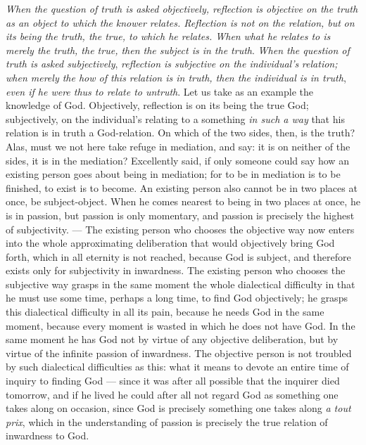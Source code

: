 \documentclass[12pt,a4paper,openany]{book}
\newcommand{\opage}[1]{\marginnote{\footnotesize\textit{[#1]}}}
\begin{document}
\emph{When the question of truth is asked objectively,
reflection is objective on the truth
as an object to which the}
\setcounter{footnote}{0}%
\opage{184}\emph{knower relates. Reflection is not on the relation, but}
\emph{on its being the truth, the true, to which he relates. When}
\emph{what he relates to is merely the truth, the true, then the subject is in the truth}.
\emph{When the question of truth is asked subjectively},
\emph{reflection is subjective on the individual's}
\emph{relation; when merely the how of this relation
is in truth, then the individual is in truth},
\emph{even if he were thus to relate to untruth}.
Let us take as an example the knowledge of God. Objectively, reflection is on its
being the true God; subjectively, on the individual's relating to a something
\emph{in such a way} that his relation is in truth a God-relation. On which of the two
sides, then, is the truth? Alas, must we not here take refuge in mediation, and say:
it is on neither of the sides, it is in the mediation? Excellently said, if only
someone could say how an existing person goes about being in mediation; for to be in
mediation is to be finished, to exist is to become. An existing person also cannot be
in two places at once, be subject-object. When he comes nearest to being in two places
at once, he is in passion, but passion is only momentary, and passion is precisely the
highest of subjectivity. --- The existing person who chooses the objective way now
enters into the whole approximating deliberation that would objectively bring God
forth, which in all eternity is not reached, because God is subject, and therefore
exists only for subjectivity in inwardness. The existing person who chooses the
subjective way grasps in the same moment the whole dialectical difficulty in that he
must use some time, perhaps a long time, to find God objectively; he grasps this
dialectical difficulty in all its pain, because he needs God in the same moment,
because every moment is wasted in which he does not have God. In the same moment he
has God not by virtue of any objective deliberation, but by virtue of the infinite
\setcounter{footnote}{0}%
\opage{185}passion of inwardness. The objective person is not troubled by such dialectical
difficulties as this: what it means to devote an entire time of inquiry to finding
God --- since it was after all possible that the inquirer died tomorrow, and if he
lived he could after all not regard God as something one takes along on occasion,
since God is precisely something one takes along \textit{a tout prix}, which in the
understanding of passion is precisely the true relation of inwardness to God.
\end{document}
